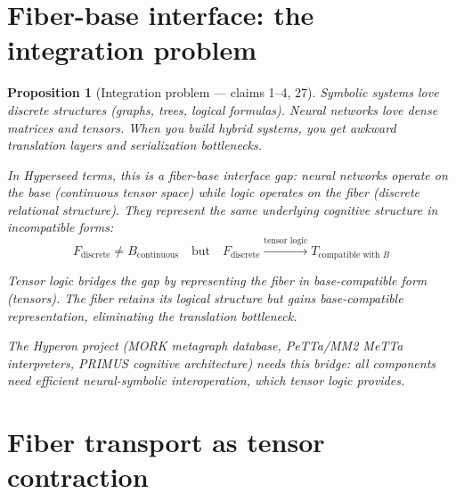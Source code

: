 \documentclass[11pt,a4paper]{article}
\newtheorem{proposition}[definition]{Proposition}
\begin{document}
\section{Fiber-base interface: the integration problem}
\label{sec:interface}

\begin{proposition}[Integration problem --- claims 1--4, 27]
\label{prop:integration}
Symbolic systems love discrete structures (graphs, trees, logical formulas).
Neural networks love dense matrices and tensors. When you build hybrid
systems, you get awkward translation layers and serialization bottlenecks.

In Hyperseed terms, this is a \emph{fiber-base interface gap}: neural
networks operate on the base (continuous tensor space) while logic operates
on the fiber (discrete relational structure). They represent the same
underlying cognitive structure in incompatible forms:
\[
  F_{\text{discrete}} \neq B_{\text{continuous}}
  \quad \text{but} \quad
  F_{\text{discrete}} \xrightarrow{\text{tensor logic}}
  T_{\text{compatible with } B}
\]

Tensor logic bridges the gap by representing the fiber in base-compatible
form (tensors). The fiber retains its logical structure but gains
base-compatible representation, eliminating the translation bottleneck.

The Hyperon project (MORK metagraph database, PeTTa/MM2 MeTTa interpreters,
PRIMUS cognitive architecture) needs this bridge: all components need
efficient neural-symbolic interoperation, which tensor logic provides.
\end{proposition}

\section{Fiber transport as tensor contraction}
\label{sec:transport}
\end{document}
